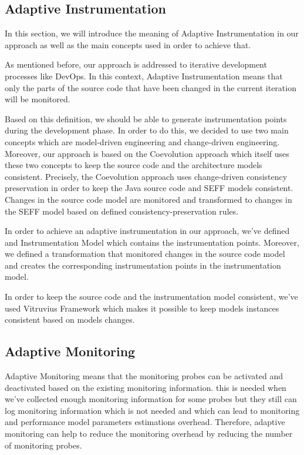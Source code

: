 \subsection{Adaptive Instrumentation }
\label{sec:Adaptive Instrumentation}
In this section, we will introduce the meaning of Adaptive Instrumentation in our approach as well as the main concepts used in order to achieve that.

As mentioned before, our approach is addressed to iterative development processes like DevOps. In this context, Adaptive Instrumentation means that only the parts of the source code that have been changed in the current iteration will be monitored. 

Based on this definition, we should be able to generate instrumentation points during the development phase. In order to do this, we decided to use two main concepts which are model-driven engineering and change-driven engineering. Moreover, our approach is based on the Coevolution approach which itself uses these two concepts to keep the source code and the architecture models consistent. Precisely, the Coevolution approach uses change-driven consistency preservation in order to keep the Java source code and SEFF models consistent. Changes in the source code model are monitored and transformed to changes in the SEFF model based on defined consistency-preservation rules. 

In order to achieve an adaptive instrumentation in our approach, we’ve defined and Instrumentation Model which contains the instrumentation points. Moreover, we defined a transformation that monitored changes in the source code model and creates the corresponding instrumentation points in the instrumentation model. 

In order to keep the source code and the instrumentation model consistent, we've used Vitruvius Framework which makes it possible to keep models instances consistent based on models changes. 

\subsection{Adaptive Monitoring}
\label{sec:Adaptive Monitoring}
Adaptive Monitoring means that the monitoring probes can be activated and deactivated based on the existing monitoring information. this is needed when we’ve collected enough monitoring information for some probes but they still can log monitoring information which is not needed and which can lead to monitoring and performance model parameters estimations overhead.  Therefore, adaptive monitoring can help to reduce the monitoring overhead by reducing the number of monitoring probes. 

